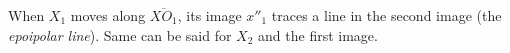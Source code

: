When $X_1$ moves along $\overline{XO_1}$, its image $x''_1$ traces a line in the second image (the \textit{epoipolar line}). Same can be said for $X_2$ and the first image.








